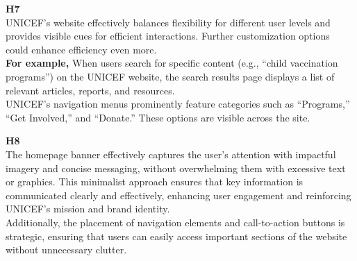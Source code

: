 \begin{description}
    \item {\textbf{H7} \color{unicefGray}{Flexibility and efficiency of use}}\\
    UNICEF’s website effectively balances flexibility for different user levels and provides visible cues for efficient interactions. Further customization options could enhance efficiency even more.\\
    \textbf{For example,} When users search for specific content (e.g., “child vaccination programs”) on the UNICEF website, the search results page displays a list of relevant articles, reports, and resources.\\
    UNICEF’s navigation menus prominently feature categories such as “Programs,” “Get Involved,” and “Donate.” These options are visible across the site.
\end{description}
\begin{description}
    \item {\textbf{H8} \color{unicefGray}{Aesthetic and minimalist design}}\\
    The homepage banner effectively captures the user's attention with impactful imagery and concise messaging, without overwhelming them with excessive text or graphics. This minimalist approach ensures that key information is communicated clearly and effectively, enhancing user engagement and reinforcing UNICEF's mission and brand identity.\\
    Additionally, the placement of navigation elements and call-to-action buttons is strategic, ensuring that users can easily access important sections of the website without unnecessary clutter.
\end{description}
